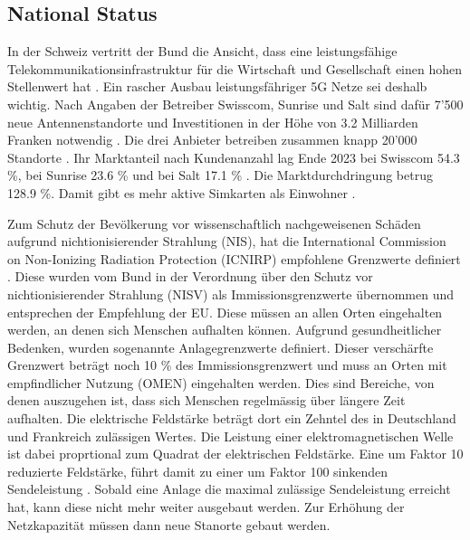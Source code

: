 \subsection{National Status}
\begin{German}
    In der Schweiz vertritt der Bund die Ansicht, dass eine leistungsfähige Telekommunikationsinfrastruktur für die Wirtschaft und Gesellschaft einen hohen Stellenwert hat \cite{bundesratNachhaltigesMobilfunknetzBericht2022}. Ein rascher Ausbau leistungsfähriger 5G Netze sei deshalb wichtig. Nach Angaben der Betreiber Swisscom, Sunrise und Salt sind dafür 7'500 neue Antennenstandorte und Investitionen in der Höhe von 3.2 Milliarden Franken notwendig \cite{bundesratNachhaltigesMobilfunknetzBericht2022}. Die drei Anbieter betreiben zusammen knapp 20'000 Standorte \cite{federalofficeofcommunicationsofcomLocationsMobilePhone}. Ihr Marktanteil nach Kundenanzahl lag Ende 2023 bei Swisscom 54.3 \%, bei Sunrise 23.6 \% und bei Salt 17.1 \% \cite{bakomMarktanteileMobilfunknetz}. Die Marktdurchdringung betrug 128.9 \%. Damit gibt es mehr aktive Simkarten als Einwohner \cite{bakomAnzahlMobilfunkkundinnenUnd}.

    Zum Schutz der Bevölkerung vor wissenschaftlich nachgeweisenen Schäden aufgrund nichtionisierender Strahlung (NIS), hat die International Commission on Non-Ionizing Radiation Protection (ICNIRP) empfohlene Grenzwerte definiert \cite{baumannMitVerordnungUeber2005}. Diese wurden vom Bund in der Verordnung über den Schutz vor nichtionisierender Strahlung (NISV) als Immissionsgrenzwerte übernommen und entsprechen der Empfehlung der EU. Diese müssen an allen Orten eingehalten werden, an denen sich Menschen aufhalten können. Aufgrund gesundheitlicher Bedenken, wurden sogenannte Anlagegrenzwerte definiert. Dieser verschärfte Grenzwert beträgt noch 10 \% des Immissionsgrenzwert und muss an Orten mit empfindlicher Nutzung (OMEN) eingehalten werden. Dies sind Bereiche, von denen auszugehen ist, dass sich Menschen regelmässig über längere Zeit aufhalten. Die elektrische Feldstärke beträgt dort ein Zehntel des in Deutschland und Frankreich zulässigen Wertes. Die Leistung einer elektromagnetischen Welle ist dabei proprtional zum Quadrat der elektrischen Feldstärke. Eine um Faktor 10 reduzierte Feldstärke, führt damit zu einer um Faktor 100 sinkenden Sendeleistung \cite{chance5gAnlagegrenzwerteImMobilfunk}.
    Sobald eine Anlage die maximal zulässige Sendeleistung erreicht hat, kann diese nicht mehr weiter ausgebaut werden. Zur Erhöhung der Netzkapazität müssen dann neue Stanorte gebaut werden. \cite{bundesratNachhaltigesMobilfunknetzBericht2022}
\end{German}

